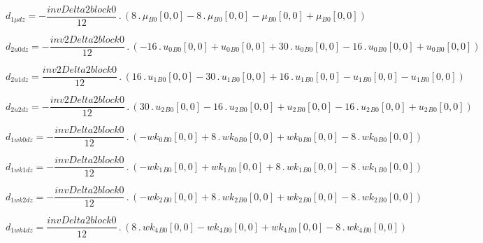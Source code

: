 \documentclass{article}
\begin{document}
\begin{dmath}d_{1 \mu dz} = - \frac{invDelta2block0}{12} \,.\, \left(8 \,.\, {\mu{_{B0}}}[{0,0}] - 8 \,.\, {\mu{_{B0}}}[{0,0}] - {\mu{_{B0}}}[{0,0}] + {\mu{_{B0}}}[{0,0}]\right)\end{dmath}

\begin{dmath}d_{2 u0 dz} = - \frac{inv2Delta2block0}{12} \,.\, \left(- 16 \,.\, {u_{0}{_{B0}}}[{0,0}] + {u_{0}{_{B0}}}[{0,0}] + 30 \,.\, {u_{0}{_{B0}}}[{0,0}] - 16 \,.\, {u_{0}{_{B0}}}[{0,0}] + {u_{0}{_{B0}}}[{0,0}]\right)\end{dmath}

\begin{dmath}d_{2 u1 dz} = \frac{inv2Delta2block0}{12} \,.\, \left(16 \,.\, {u_{1}{_{B0}}}[{0,0}] - 30 \,.\, {u_{1}{_{B0}}}[{0,0}] + 16 \,.\, {u_{1}{_{B0}}}[{0,0}] - {u_{1}{_{B0}}}[{0,0}] - {u_{1}{_{B0}}}[{0,0}]\right)\end{dmath}

\begin{dmath}d_{2 u2 dz} = - \frac{inv2Delta2block0}{12} \,.\, \left(30 \,.\, {u_{2}{_{B0}}}[{0,0}] - 16 \,.\, {u_{2}{_{B0}}}[{0,0}] + {u_{2}{_{B0}}}[{0,0}] - 16 \,.\, {u_{2}{_{B0}}}[{0,0}] + {u_{2}{_{B0}}}[{0,0}]\right)\end{dmath}

\begin{dmath}d_{1 wk0 dz} = - \frac{invDelta2block0}{12} \,.\, \left(- {wk_{0}{_{B0}}}[{0,0}] + 8 \,.\, {wk_{0}{_{B0}}}[{0,0}] + {wk_{0}{_{B0}}}[{0,0}] - 8 \,.\, {wk_{0}{_{B0}}}[{0,0}]\right)\end{dmath}

\begin{dmath}d_{1 wk1 dz} = - \frac{invDelta2block0}{12} \,.\, \left(- {wk_{1}{_{B0}}}[{0,0}] + {wk_{1}{_{B0}}}[{0,0}] + 8 \,.\, {wk_{1}{_{B0}}}[{0,0}] - 8 \,.\, {wk_{1}{_{B0}}}[{0,0}]\right)\end{dmath}

\begin{dmath}d_{1 wk2 dz} = - \frac{invDelta2block0}{12} \,.\, \left(- {wk_{2}{_{B0}}}[{0,0}] + 8 \,.\, {wk_{2}{_{B0}}}[{0,0}] + {wk_{2}{_{B0}}}[{0,0}] - 8 \,.\, {wk_{2}{_{B0}}}[{0,0}]\right)\end{dmath}

\begin{dmath}d_{1 wk4 dz} = \frac{invDelta2block0}{12} \,.\, \left(8 \,.\, {wk_{4}{_{B0}}}[{0,0}] - {wk_{4}{_{B0}}}[{0,0}] + {wk_{4}{_{B0}}}[{0,0}] - 8 \,.\, {wk_{4}{_{B0}}}[{0,0}]\right)\end{dmath}
\end{document}
